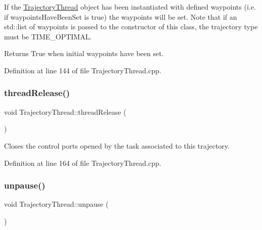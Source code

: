 If the \hyperlink{classocra__recipes_1_1TrajectoryThread}{Trajectory\+Thread} object has been instantiated with defined waypoints (i.\+e. if waypoints\+Have\+Been\+Set is true) the waypoints will be set. Note that if an std\+::list of waypoints is passed to the constructor of this class, the trajectory type must be T\+I\+M\+E\+\_\+\+O\+P\+T\+I\+M\+AL.

\begin{DoxyReturn}{Returns}
True when initial waypoints have been set. 
\end{DoxyReturn}


Definition at line 144 of file Trajectory\+Thread.\+cpp.

\hypertarget{classocra__recipes_1_1TrajectoryThread_a73f7ed04cf26697ca533b355930df23b}{}\label{classocra__recipes_1_1TrajectoryThread_a73f7ed04cf26697ca533b355930df23b} 
\subsubsection{\texorpdfstring{thread\+Release()}{threadRelease()}}
{\footnotesize\ttfamily void Trajectory\+Thread\+::thread\+Release (\begin{DoxyParamCaption}{ }\end{DoxyParamCaption})\hspace{0.3cm}{\ttfamily [virtual]}}

Closes the control ports opened by the task associated to this trajectory. 

Definition at line 164 of file Trajectory\+Thread.\+cpp.

\hypertarget{classocra__recipes_1_1TrajectoryThread_ae5883c5bbd43285b1c548083219f709f}{}\label{classocra__recipes_1_1TrajectoryThread_ae5883c5bbd43285b1c548083219f709f} 
\subsubsection{\texorpdfstring{unpause()}{unpause()}}
{\footnotesize\ttfamily void Trajectory\+Thread\+::unpause (\begin{DoxyParamCaption}{ }\end{DoxyParamCaption})}


